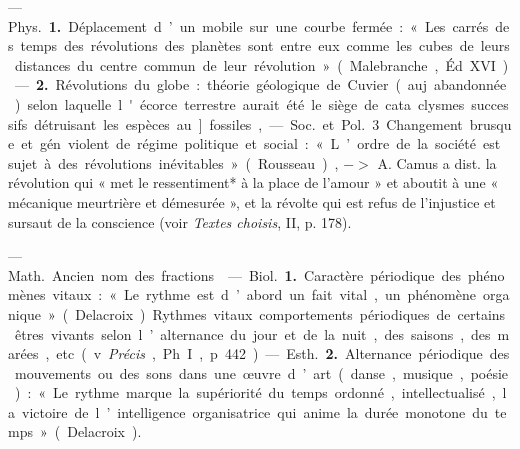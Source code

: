 \begin{itemize}[leftmargin=1cm, label=, itemsep=1pt]
 — \si{Phys.} {\bf 1.} Déplacement
d’un mobile sur une courbe fermée :
« Les carrés des temps des révolutions des planètes sont entre eux
comme les cubes de leurs distances
du centre commun de leur révolution » (Malebranche, Éd. XVI)
— {\bf 2.} Révolutions du globe : théorie
géologique de Cuvier (auj. abandonnée) selon laquelle l'écorce terrestre aurait été le siège de cata
clysmes successifs détruisant les
espèces au]. fossiles,

— \si{Soc.} et \si{Pol.} 3 Changement
brusque et gén. violent de régime
politique et social : « L’ordre de la
société est sujet à des révolutions
inévitables » (Rousseau), $->$
A. Camus a dist. la révolution qui
« met le ressentiment* à la place de
l'amour » et aboutit à une « mécanique meurtrière et démesurée », et
la révolte qui est refus de l'injustice
et sursaut de la conscience (voir
{\it Textes choisis}, II, p. 178).

 — \si{Math.} Ancien
nom des fractions.

 — \si{Biol.} {\bf 1.} Caractère périodique des phénomènes vitaux : « Le
rythme est d’abord un fait vital, un
phénomène organique » (Delacroix).
Rythmes vitaux comportements
périodiques de certains êtres vivants
selon l’alternance du jour et de la
nuit, des saisons, des marées, etc.
(v. {\it Précis}, Ph. I, p. 442).

— \si{Esth.} {\bf 2.} Alternance périodique des mouvements ou des sons
dans une œuvre d’art (danse, musique, poésie) : « Le rythme marque
la supériorité du temps ordonné,
intellectualisé, la victoire de l’intelligence organisatrice qui anime la
durée monotone du temps » (Delacroix).

	\end{itemize}

